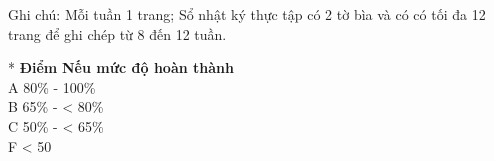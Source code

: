 \documentclass[12pt, a4paper]{article}
\begin{document}
\vspace{0.5cm}
\noindent Ghi chú: Mỗi tuần 1 trang; Sổ nhật ký thực tập có 2 tờ bìa và có có tối đa 12 trang để ghi chép từ 8 đến 12 tuần.

\vspace{0.5cm}
\noindent
* \textbf{Điểm} \hspace{1cm} \textbf{Nếu mức độ hoàn thành}\\
\hspace*{0.3cm} A \hspace{1.5cm} 80\% - 100\%\\
\hspace*{0.3cm} B \hspace{1.5cm} 65\% - < 80\%\\
\hspace*{0.3cm} C \hspace{1.5cm} 50\% - < 65\%\\
\hspace*{0.3cm} F \hspace{1.5cm} < 50
\end{document}
